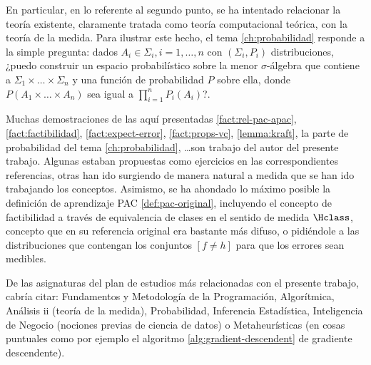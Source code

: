 En particular, en lo referente al segundo punto, se ha intentado relacionar la teoría existente, claramente tratada como 
teoría computacional teórica, con la teoría de la medida. Para ilustrar este hecho, el tema \ref{ch:probabilidad} responde a la 
simple pregunta: dados $A_i \in \Sigma_i, i=1, \ldots, n$ con $(\Sigma_i, P_i)$ distribuciones, ¿puedo construir un espacio probabilístico
sobre la menor $\sigma$-álgebra que contiene a $\Sigma_1 \times \ldots \times \Sigma_n$ y una función de probabilidad $P$ sobre ella,
donde $P(A_1 \times \ldots \times A_n)$ sea igual a $\prod_{i=1}^n P_i(A_i)$?. 

Muchas demostraciones de las aquí presentadas \ref{fact:rel-pac-apac}, \ref{fact:factibilidad}, \ref{fact:expect-error},
\ref{fact:props-vc}, \ref{lemma:kraft}, la parte de probabilidad del tema \ref{ch:probabilidad}, \ldots son trabajo del autor del presente
trabajo. Algunas estaban propuestas como ejercicios en las correspondientes referencias, otras han ido surgiendo de manera natural a medida que 
se han ido trabajando los conceptos. Asimismo, se ha ahondado lo máximo posible la definición de aprendizaje PAC \ref{def:pac-original},
incluyendo el concepto de factibilidad a través de equivalencia de clases en el sentido de medida $\Hclass$, concepto que en su
referencia original era bastante más difuso, o pidiéndole a las distribuciones que contengan los conjuntos $[f\neq h]$ para
que los errores sean medibles.

De las asignaturas del plan de estudios más relacionadas con el presente trabajo, cabría citar: Fundamentos y Metodología
de la Programación, Algorítmica, Análisis ii (teoría de la medida), Probabilidad, Inferencia Estadística, Inteligencia
de Negocio (nociones previas de ciencia de datos) o Metaheurísticas (en cosas puntuales como por ejemplo el algoritmo 
\ref{alg:gradient-descendent} de gradiente descendente).
